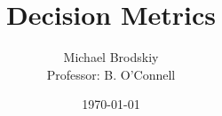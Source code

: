


\title{Decision Metrics}
\date{\today}
\author{Michael Brodskiy\\ \small Professor: B. O'Connell}



\maketitle

